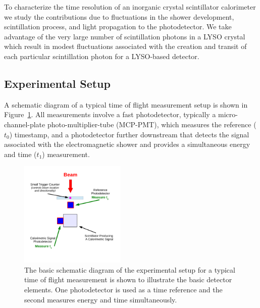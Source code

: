 To characterize the time resolution of an inorganic crystal scintillator calorimeter we
study the contributions due to fluctuations in the shower development, scintillation process, 
and light propagation to the photodetector.  We take advantage of the very large number of 
scintillation photons in a LYSO crystal which result in modest fluctuations associated with the 
creation and transit of each particular scintillation photon for a LYSO-based detector. 

\subsection{Experimental Setup}
A schematic diagram of a typical time of flight measurement setup is shown in 
Figure~\ref{fig:TypicalSchematicDiagram}. All measurements involve a fast photodetector,  
typically a micro-channel-plate photo-multiplier-tube 
(MCP-PMT), which  measures the reference ($t_{0}$) timestamp, and a photodetector further 
downstream that detects the signal associated with the electromagnetic shower and provides 
a simultaneous energy and time ($t_{1}$) measurement. 

\begin{figure}[ht!] \centering
\includegraphics[width=0.45\textwidth]{figs/TypicalSchematicDiagram} 
\caption{\small The basic schematic diagram of the experimental setup for
a typical time of flight measurement is shown to illustrate the
basic detector elements. One photodetector is used as a time reference and the second 
measures energy and time simultaneously.} 
\label{fig:TypicalSchematicDiagram}
\end{figure}


